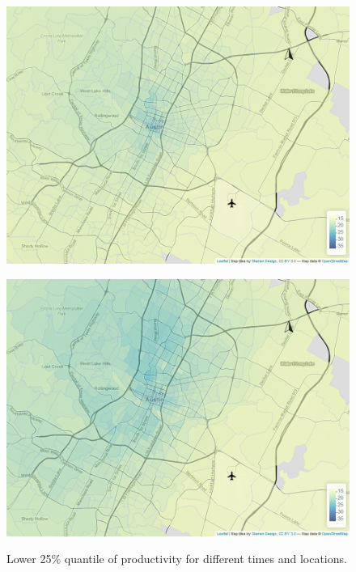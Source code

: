 \begin{figure}[htb]
\begin{minipage}[t]{0.48\linewidth}
        \label{fig:quantiles:0.25:b}
    \end{minipage}\hfill
    \begin{minipage}[t]{.48\linewidth}
        \centering
        \includegraphics[width=\linewidth]{img/quantile_142_25.png}
        \label{fig:quantiles:0.25:c}
    \end{minipage}
    \begin{minipage}[t]{0.48\linewidth}
        \centering
        \includegraphics[width=\linewidth]{img/quantile_168_25.png}
        \label{fig:quantiles:0.25:d}
    \end{minipage}
    \caption{Lower 25\% quantile of productivity for different times and locations.}
    \label{fig:quantiles:0.25}
\end{figure}



